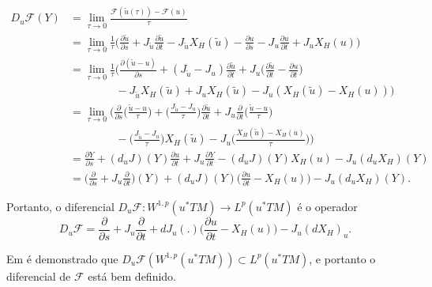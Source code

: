 \documentclass[12pt]{book}
\newcommand{\bigparenteses}[1]{\Big( #1 \Big) }
\newcommand{\campohamiltoniano}[1]{X_{H}(#1)}
\newcommand{\campohamiltonianoabrev}{X_{H}}
\newcommand{\diferencialfloerponto}[1]{D_{#1}\operadorFloer}
\newcommand{\derivadaparcial}[2]{\frac{\partial #1}{\partial #2}}
\newcommand{\diferencialhamiltoniano}[1]{(dX_{H})_{#1}}
\newcommand{\espacoLp}[1]{L^{p}(#1)}
\newcommand{\espacosobolev}[1]{W^{1,p}(#1)}
\newcommand{\operadorFloer}{\mathcal{F}}
\newcommand{\operadorFloerParametro}[1]{\mathcal{F}(#1)}
\newcommand{\pullbackfibradotangente}[2]{#1^{*}T#2}
\newcommand{\pullbackfibradotangenteM}[1]{\pullbackfibradotangente{#1}{M}}
\begin{document}
	$$
	\begin{aligned}
	\diferencialfloerponto{u}(Y)
	&=	\lim\limits_{\tau\to 0}\frac{\operadorFloerParametro{\tilde{u}(\tau)} - \operadorFloerParametro{u}}{\tau}
	\\
	&=\lim\limits_{\tau\to 0}\frac{1}{\tau}
	\bigparenteses{
		\derivadaparcial{\tilde{u}}{s} + J_{\tilde{u}}\derivadaparcial{\tilde{u}}{t}-J_{\tilde{u}}\campohamiltoniano{\tilde{u}}
		-\derivadaparcial{u}{s} - J_{u}\derivadaparcial{u}{t} + J_{u}\campohamiltoniano{u}
	}
	\\
	&=
	\lim\limits_{\tau\to 0}\frac{1}{\tau}
	\bigparenteses{
		\derivadaparcial{(\tilde{u}-u)}{s}
		+(J_{\tilde{u}}-J_{u})\derivadaparcial{\tilde{u}}{t}
		+J_{u}\Big(\derivadaparcial{\tilde{u}}{t}-\derivadaparcial{u}{t}\Big)
		\\
		&\;\;\;\;\;\;\;\;\;\;\;\;\;\;\;-J_{\tilde{u}}\campohamiltoniano{\tilde{u}}+J_{u}\campohamiltoniano{\tilde{u}}
		-J_{u}(\campohamiltoniano{\tilde{u}}-\campohamiltoniano{u})}
	\\
	&=\lim\limits_{\tau\to 0}
	\bigparenteses{
		\derivadaparcial{}{s}\bigparenteses{\frac{\tilde{u}-u}{\tau}}
		+\bigparenteses{\frac{J_{\tilde{u}}-J_{u}}{\tau}}\derivadaparcial{\tilde{u}}{t} + J_{u}\derivadaparcial{}{t}\bigparenteses{\frac{\tilde{u}-u}{\tau}}
		\\&\;\;\;\;\;\;\;\;\;\;\;\;\;\;\;-\bigparenteses{\frac{J_{\tilde{u}}-J_{u}}{\tau}}\campohamiltoniano{\tilde{u}}-J_{u}\bigparenteses{\frac{\campohamiltoniano{\tilde{u}}-\campohamiltoniano{u} }{\tau}}
	}
	\\
	&=\derivadaparcial{Y}{s}+(d_{u}J)(Y)\derivadaparcial{u}{t}+J_{u}\derivadaparcial{Y}{t} -(d_{u}J)(Y)\campohamiltoniano{u}-J_{u}(d_{u}\campohamiltonianoabrev)(Y)
	\\
	&=\bigparenteses{\derivadaparcial{}{s}+J_{u}\derivadaparcial{}{t}}(Y)+(d_{u}J)(Y)\bigparenteses{ \derivadaparcial{u}{t} - \campohamiltoniano{u}}-J_{u}(d_{u}\campohamiltonianoabrev)(Y).
	\end{aligned}
	$$
	
	Portanto, o diferencial $\diferencialfloerponto{u}: \espacosobolev{\pullbackfibradotangenteM{u}}\to \espacoLp{\pullbackfibradotangenteM{u}}$ é o operador
	$$
		\diferencialfloerponto{u} =  \derivadaparcial{}{s} + J_{u}\derivadaparcial {}{t} + dJ_{u}(.)\bigparenteses{\derivadaparcial{u}{t} - X_{H}(u)} - J_{u} \diferencialhamiltoniano{u}.
	$$
		
	Em \cite{audi_floer_homology} é demonstrado que $\diferencialfloerponto{u}(\espacosobolev{\pullbackfibradotangenteM{u}})\subset \espacoLp{\pullbackfibradotangenteM{u}}$, e portanto o diferencial de $\operadorFloer$  está bem definido.
	
\end{document}
